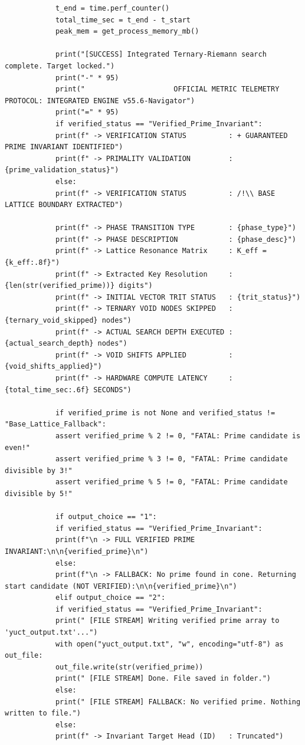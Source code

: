 \documentclass[12pt,a4paper]{article}
\theoremstyle{remark}
\begin{document}
\begin{tcolorbox}
\begin{lstlisting}
			t_end = time.perf_counter()
			total_time_sec = t_end - t_start
			peak_mem = get_process_memory_mb()
			
			print("[SUCCESS] Integrated Ternary-Riemann search complete. Target locked.")
			print("-" * 95)
			print("                     OFFICIAL METRIC TELEMETRY PROTOCOL: INTEGRATED ENGINE v55.6-Navigator")
			print("=" * 95)
			if verified_status == "Verified_Prime_Invariant":
			print(f" -> VERIFICATION STATUS          : + GUARANTEED PRIME INVARIANT IDENTIFIED")
			print(f" -> PRIMALITY VALIDATION         : {prime_validation_status}")
			else:
			print(f" -> VERIFICATION STATUS          : /!\\ BASE LATTICE BOUNDARY EXTRACTED")
			
			print(f" -> PHASE TRANSITION TYPE        : {phase_type}")
			print(f" -> PHASE DESCRIPTION            : {phase_desc}")
			print(f" -> Lattice Resonance Matrix     : K_eff = {k_eff:.8f}")
			print(f" -> Extracted Key Resolution     : {len(str(verified_prime))} digits")
			print(f" -> INITIAL VECTOR TRIT STATUS   : {trit_status}")
			print(f" -> TERNARY VOID NODES SKIPPED   : {ternary_void_skipped} nodes")
			print(f" -> ACTUAL SEARCH DEPTH EXECUTED : {actual_search_depth} nodes")
			print(f" -> VOID SHIFTS APPLIED          : {void_shifts_applied}")
			print(f" -> HARDWARE COMPUTE LATENCY     : {total_time_sec:.6f} SECONDS")
			
			if verified_prime is not None and verified_status != "Base_Lattice_Fallback":
			assert verified_prime % 2 != 0, "FATAL: Prime candidate is even!"
			assert verified_prime % 3 != 0, "FATAL: Prime candidate divisible by 3!"
			assert verified_prime % 5 != 0, "FATAL: Prime candidate divisible by 5!"
			
			if output_choice == "1":
			if verified_status == "Verified_Prime_Invariant":
			print(f"\n -> FULL VERIFIED PRIME INVARIANT:\n\n{verified_prime}\n")
			else:
			print(f"\n -> FALLBACK: No prime found in cone. Returning start candidate (NOT VERIFIED):\n\n{verified_prime}\n")
			elif output_choice == "2":
			if verified_status == "Verified_Prime_Invariant":
			print(" [FILE STREAM] Writing verified prime array to 'yuct_output.txt'...")
			with open("yuct_output.txt", "w", encoding="utf-8") as out_file:
			out_file.write(str(verified_prime))
			print(" [FILE STREAM] Done. File saved in folder.")
			else:
			print(" [FILE STREAM] FALLBACK: No verified prime. Nothing written to file.")
			else:
			print(f" -> Invariant Target Head (ID)   : Truncated")
			

\end{lstlisting}
\end{tcolorbox}
\end{document}
